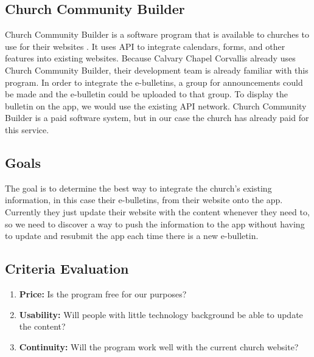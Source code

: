 \documentclass[letterpaper,10pt,draftclsnofoot,onecolumn,titlepage]{IEEEtran}
\begin{document}
	\subsection{Church Community Builder}
	Church Community Builder is a software program that is available to churches to use for their websites \cite{CCB}.
	It uses API to integrate calendars, forms, and other features into existing websites.
	Because Calvary Chapel Corvallis already uses Church Community Builder, their development team is already familiar with this program.
	In order to integrate the e-bulletins, a group for announcements could be made and the e-bulletin could be uploaded to that group.
	To display the bulletin on the app, we would use the existing API network.
	Church Community Builder is a paid software system, but in our case the church has already paid for this service.

	\subsection{Goals}
	The goal is to determine the best way to integrate the church's existing information, in this case their e-bulletins, from their website onto the app.
	Currently they just update their website with the content whenever they need to, so we need to discover a way to push the information to the app without having to update and resubmit the app each time there is a new e-bulletin.

	\subsection{Criteria Evaluation}
		\begin{enumerate}
			\item \textbf{Price:} Is the program free for our purposes?
			\item \textbf{Usability:} Will people with little technology background be able to update the content?
			\item \textbf{Continuity:} Will the program work well with the current church website?
		\end{enumerate}
\end{document}
